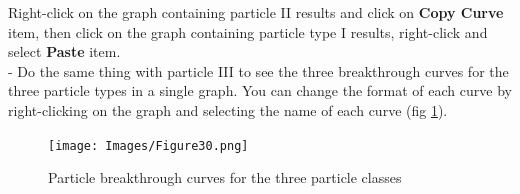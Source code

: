 \begin{itemize}
Right-click on the graph containing particle II results and click on \textbf{Copy Curve} item, then click on the graph containing particle type I results, right-click and select \textbf{Paste} item. \\ - Do the same thing with particle III to see the three breakthrough curves for the three particle types in a single graph. You can change the format of each curve by right-clicking on the graph and selecting the name of each curve (fig \ref{fig:30}).
\begin{figure}[!ht]
\begin{center}
\texttt{[image: Images/Figure30.png]} \\
\caption{Particle breakthrough curves for the three particle classes}\label{fig:30}
\end{center}
\end{figure}

\end{itemize}
\newpage
